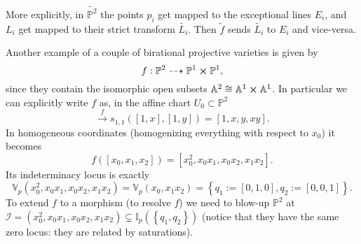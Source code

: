 \begin{ex}
	More explicitly, in $\widetilde{\mathbb{P}^{2}}$ the points $p_i$ get mapped to the exceptional lines $E_i$, and $L_i$
	get mapped to their strict transform $\widetilde{L_i}$.
	Then $\tilde{f}$ sends $\widetilde{L_i}$ to $E_i$ and vice-versa.
\end{ex} 

\begin{ex}
	Another example of a couple of birational projective varieties is given by
	\begin{equation}
	f: \mathbb{P}^{2} \dashrightarrow \mathbb{P}^{1} \cross \mathbb{P}^{1}
	,\end{equation} 
	since they contain the isomorphic open subsets $\mathbb{A}^{2} \cong \mathbb{A}^{1} \cross \mathbb{A}^{1}$.
	In particular we can explicitly write $f$ as, in the affine chart $U_0 \subset \mathbb{P}^{2}$
	\begin{equation}
	[1,x,y] \xrightarrow{f} s_{1,1} \left( [1,x], [1,y] \right) = [1, x, y, xy]
	.\end{equation} 
	In homogeneous coordinates (homogenizing everything with respect to $x_0$) it becomes
	\begin{equation}
		f \left( [x_0, x_1, x_2] \right) = [x_0^2, x_0x_1, x_0x_2, x_1x_2]
	.\end{equation} 
	Its indeterminacy locus is exactly
	\begin{equation}
	\mathbb{V}_p\left( x_0^2, x_0x_1, x_0x_2, x_1x_2 \right) =
	\mathbb{V}_p\left( x_0, x_1x_2 \right) = 
	\left\{ q_1 := [0,1,0], q_2 := [0,0,1] \right\}
	.\end{equation} 
	To extend $f$ to a morphism (to resolve $f$) we need to blow-up $\mathbb{P}^{2}$ at
	$\mathcal{I} = \left( x_0^2, x_0x_1, x_0x_2, x_1x_2 \right) \subsetneq \mathbb{I}_p(\left\{ q_1, q_2 \right\})$
	(notice that they have the same zero locus: they are related by saturations).


\end{ex}
